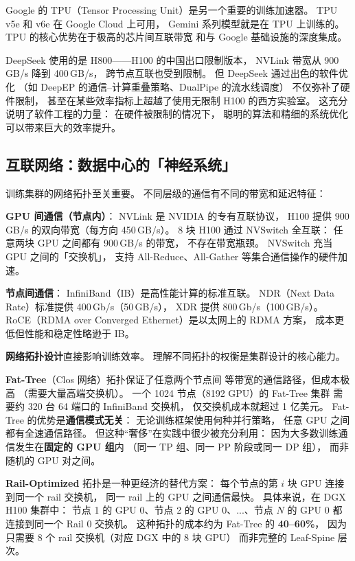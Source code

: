 Google 的 TPU（Tensor Processing Unit）是另一个重要的训练加速器。
TPU v5e 和 v6e 在 Google Cloud 上可用，
Gemini 系列模型就是在 TPU 上训练的。
TPU 的核心优势在于极高的芯片间互联带宽
和与 Google 基础设施的深度集成。

DeepSeek 使用的是 H800——H100 的中国出口限制版本，
NVLink 带宽从 900\,GB/s 降到 400\,GB/s，
跨节点互联也受到限制。
但 DeepSeek 通过出色的软件优化
（如 DeepEP 的通信--计算重叠策略、DualPipe 的流水线调度）
不仅弥补了硬件限制，
甚至在某些效率指标上超越了使用无限制 H100 的西方实验室。
这充分说明了软件工程的力量：
在硬件被限制的情况下，
聪明的算法和精细的系统优化可以带来巨大的效率提升。

\subsection{互联网络：数据中心的「神经系统」}

训练集群的网络拓扑至关重要。
不同层级的通信有不同的带宽和延迟特征：

\textbf{GPU 间通信（节点内）}：
NVLink 是 NVIDIA 的专有互联协议，
H100 提供 900\,GB/s 的双向带宽（每方向 450\,GB/s）。
8 块 H100 通过 NVSwitch 全互联：
任意两块 GPU 之间都有 900\,GB/s 的带宽，
不存在带宽瓶颈。
NVSwitch 充当 GPU 之间的「交换机」，
支持 All-Reduce、All-Gather 等集合通信操作的硬件加速。

\textbf{节点间通信}：
InfiniBand（IB）是高性能计算的标准互联。
NDR（Next Data Rate）标准提供 400\,Gb/s（50\,GB/s），
XDR 提供 800\,Gb/s（100\,GB/s）。
RoCE（RDMA over Converged Ethernet）是以太网上的 RDMA 方案，
成本更低但性能和稳定性略逊于 IB。

\textbf{网络拓扑设计}直接影响训练效率。
理解不同拓扑的权衡是集群设计的核心能力。

\textbf{Fat-Tree}（Clos 网络）拓扑保证了任意两个节点间
等带宽的通信路径，但成本极高
（需要大量高端交换机）。
一个 1024 节点（8192 GPU）的 Fat-Tree 集群
需要约 320 台 64 端口的 InfiniBand 交换机，
仅交换机成本就超过 1 亿美元。
Fat-Tree 的优势是\textbf{通信模式无关}：
无论训练框架使用何种并行策略，
任意 GPU 之间都有全速通信路径。
但这种“奢侈”在实践中很少被充分利用：
因为大多数训练通信发生在\textbf{固定的 GPU 组}内
（同一 TP 组、同一 PP 阶段或同一 DP 组），
而非随机的 GPU 对之间。

\textbf{Rail-Optimized} 拓扑是一种更经济的替代方案：
每个节点的第 $i$ 块 GPU 连接到同一个 rail 交换机，
同一 rail 上的 GPU 之间通信最快。
具体来说，在 DGX H100 集群中：
节点 1 的 GPU 0、节点 2 的 GPU 0、...、节点 $N$ 的 GPU 0
都连接到同一个 Rail 0 交换机。
这种拓扑的成本约为 Fat-Tree 的 \textbf{40--60\%}，
因为只需要 8 个 rail 交换机（对应 DGX 中的 8 块 GPU）
而非完整的 Leaf-Spine 层次。

